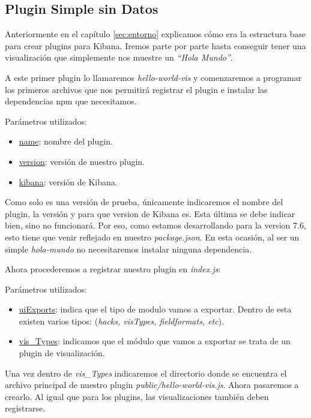 \documentclass[a4paper, 12pt]{book}
\begin{document}
\subsection{Plugin Simple sin Datos}
\label{sec:holamundo}
Anteriormente en el capítulo \ref{sec:entorno}  explicamos cómo era la estructura base para crear plugins para Kibana. Iremos parte por parte hasta conseguir tener una visualización que simplemente nos muestre un \textit{“Hola Mundo”}.

A este primer plugin lo llamaremos \textit{hello-world-vis} y comenzaremos a programar los primeros archivos que nos permitirá registrar el plugin e instalar las dependencias npm que necesitamos.



Parámetros utilizados:
\begin{itemize}
    \item \underline{name}: nombre del plugin.
    \item \underline{version}: versión de nuestro plugin.
    \item \underline{kibana}: versión de Kibana.
\end{itemize}

Como solo es una versión de prueba, únicamente indicaremos el nombre del plugin, la versión y para que version de Kibana es. Esta última se debe indicar bien, sino no funcionará. Por eso, como estamos desarrollando para la version 7.6, esto tiene que venir reflejado en nuestro \textit{package.json}. En esta ocasión, al ser un simple \textit{hola-mundo} no necesitaremos instalar ninguna dependencia.

Ahora procederemos a registrar nuestro plugin en \textit{index.js}:



Parámetros utilizados:
\begin{itemize}
    \item \underline{uiExports}: indica que el tipo de modulo vamos a exportar. Dentro de esta existen varios tipos: (\textit{hacks, visTypes, fieldformats, etc}).
    \item \underline{vis\_Types}: indicamos que el módulo que vamos a exportar se trata de un plugin de visualización.
\end{itemize}

Una vez dentro de \textit{vis\_Types} indicaremos el directorio donde se encuentra el archivo principal de nuestro plugin \textit{public/hello-world-vis.js}. Ahora pasaremos a crearlo. Al igual que para los plugins, las visualizaciones también deben registrarse. 
\end{document}
